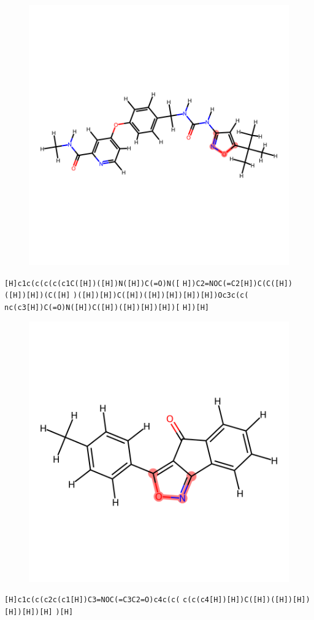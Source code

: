 \documentclass{article}
\begin{document}
\begin{figure}[ht]
\centering
    \includegraphics{mol170.png}
\end{figure}
\verb|[H]c1c(c(c(c(c1C([H])([H])N([H])C(=O)N([| \verb|H])C2=NOC(=C2[H])C(C([H])([H])[H])(C([H]| \verb|)([H])[H])C([H])([H])[H])[H])[H])Oc3c(c(| \verb|nc(c3[H])C(=O)N([H])C([H])([H])[H])[H])[| \verb|H])[H]|

\begin{figure}[ht]
\centering
    \includegraphics{mol171.png}
\end{figure}
\verb|[H]c1c(c(c2c(c1[H])C3=NOC(=C3C2=O)c4c(c(| \verb|c(c(c4[H])[H])C([H])([H])[H])[H])[H])[H]| \verb|)[H]|
\end{document}
